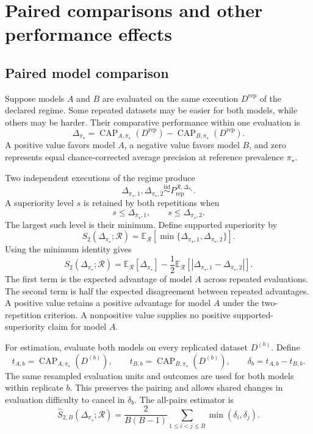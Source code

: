 \documentclass[11pt]{article}
\newcommand{\CAP}{\operatorname{CAP}}
\newcommand{\Regime}{\mathcal{R}}
\newcommand{\E}{\mathbb{E}}
\newcommand{\iid}{\mathrel{\overset{\mathrm{iid}}{\sim}}}
\theoremstyle{remark}
\begin{document}
\section{Paired comparisons and other performance effects}
\label{sec:paired}

\subsection{Paired model comparison}

Suppose models $A$ and $B$ are evaluated on the same execution $D^{\mathrm{rep}}$ of the declared regime. Some repeated datasets may be easier for both models, while others may be harder. Their comparative performance within one evaluation is
\begin{equation}
\Delta_{\pi_\star}
=
\CAP_{A,\pi_\star}(D^{\mathrm{rep}})
-
\CAP_{B,\pi_\star}(D^{\mathrm{rep}}).
\label{eq:paired-difference}
\end{equation}
A positive value favors model $A$, a negative value favors model $B$, and zero represents equal chance-corrected average precision at reference prevalence $\pi_\star$.

Two independent executions of the regime produce
\[
\Delta_{\pi_\star,1},
\Delta_{\pi_\star,2}
\iid
P_{\mathrm{rep}}^{\Regime,\Delta_{\pi_\star}}.
\]
A superiority level $s$ is retained by both repetitions when
\[
s\leq \Delta_{\pi_\star,1},
\qquad
s\leq \Delta_{\pi_\star,2}.
\]
The largest such level is their minimum. Define supported superiority by
\begin{equation}
S_2(\Delta_{\pi_\star};\Regime)
=
\E_{\Regime}
\left[
\min\{
\Delta_{\pi_\star,1},
\Delta_{\pi_\star,2}
\}
\right].
\label{eq:paired}
\end{equation}
Using the minimum identity gives
\begin{equation}
S_2(\Delta_{\pi_\star};\Regime)
=
\E_{\Regime}[\Delta_{\pi_\star}]
-
\frac12
\E_{\Regime}
\left[
|\Delta_{\pi_\star,1}-\Delta_{\pi_\star,2}|
\right].
\label{eq:paired-decomposition}
\end{equation}
The first term is the expected advantage of model $A$ across repeated evaluations. The second term is half the expected disagreement between repeated advantages. A positive value retains a positive advantage for model $A$ under the two-repetition criterion. A nonpositive value supplies no positive supported-superiority claim for model $A$.

For estimation, evaluate both models on every replicated dataset $D^{(b)}$. Define
\[
t_{A,b}=\CAP_{A,\pi_\star}(D^{(b)}),
\qquad
t_{B,b}=\CAP_{B,\pi_\star}(D^{(b)}),
\qquad
\delta_b=t_{A,b}-t_{B,b}.
\]
The same resampled evaluation units and outcomes are used for both models within replicate $b$. This preserves the pairing and allows shared changes in evaluation difficulty to cancel in $\delta_b$. The all-pairs estimator is
\begin{equation}
\widehat S_{2,B}(\Delta_{\pi_\star};\Regime)
=
\frac{2}{B(B-1)}
\sum_{1\leq i<j\leq B}
\min(\delta_i,\delta_j).
\label{eq:paired-estimator}
\end{equation}
\end{document}
